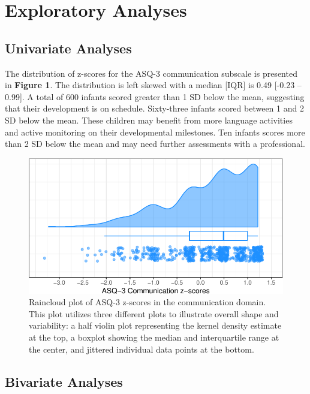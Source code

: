 \documentclass[sn-basic,pdflatex]{sn-jnl}
\begin{document}
\section{Exploratory Analyses}\label{exploratory-analyses}

\subsection{Univariate Analyses}\label{univariate-analyses}

The distribution of z-scores for the ASQ-3 communication subscale is
presented in \textbf{Figure 1}. The distribution is left skewed with a
median {[}IQR{]} is 0.49 {[}-0.23 -- 0.99{]}. A total of 600 infants
scored greater than 1 SD below the mean, suggesting that their
development is on schedule. Sixty-three infants scored between 1 and 2
SD below the mean. These children may benefit from more language
activities and active monitoring on their developmental milestones. Ten
infants scores more than 2 SD below the mean and may need further
assessments with a professional.

\begin{figure}

{\centering \includegraphics{HWC_final-paper-draft_files/figure-latex/fig_rain_ASQ-1} 

}

\caption{Raincloud plot of ASQ-3 z-scores in the communication domain. This plot utilizes three different plots to illustrate overall shape and variability: a half violin plot representing the kernel density estimate at the top, a boxplot showing the median and interquartile range at the center, and jittered individual data points at the bottom.}\label{fig:fig_rain_ASQ}
\end{figure}

\subsection{Bivariate Analyses}\label{bivariate-analyses}
\end{document}
